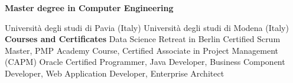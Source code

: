 %
%
%

\textbf{Master degree in Computer Engineering}
\begin{scholarship}
					{Università degli studi di Pavia (Italy)}
					{Università degli studi di Modena (Italy)}
\textbf{Courses and Certificates}
					{Data Science Retreat in Berlin}
					{Certified Scrum Master, PMP Academy Course, Certified Associate in Project Management (CAPM)}
					{Oracle Certified Programmer, Java Developer, Business Component Developer, Web Application Developer, Enterprise Architect}
\end{scholarship}
					
					

